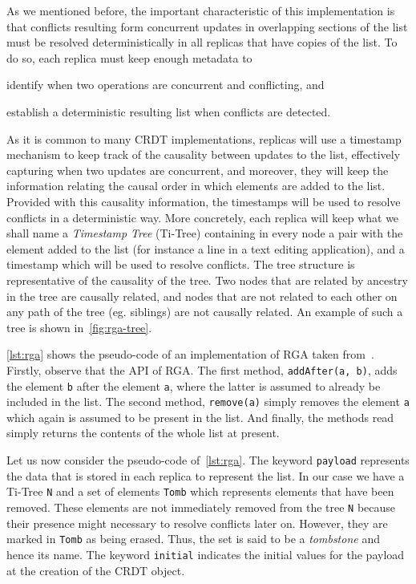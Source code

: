 As we mentioned before, the important characteristic of this
implementation is that conflicts resulting form concurrent updates in
overlapping sections of the list must be resolved deterministically in
all replicas that have copies of the list.
%
To do so, each replica must keep enough metadata to
\begin{inparaenum}
\item identify when two operations are concurrent and conflicting, and
\item establish a deterministic resulting list when conflicts are detected.
\end{inparaenum}
%
As it is common to many CRDT implementations, replicas will use a
timestamp mechanism to keep track of the causality between updates to
the list, effectively capturing when two updates are concurrent, and
moreover, they will keep the information relating the causal order in
which elements are added to the list.
%
Provided with this causality information, the timestamps will be used
to resolve conflicts in a deterministic way.
%
More concretely, each replica will keep what we shall name a
\emph{Timestamp Tree} (Ti-Tree) containing in every node a pair with the
element added to the list (for instance a line in a text editing
application), and a timestamp which will be used to resolve conflicts.
The tree structure is representative of the causality of the tree.
Two nodes that are related by ancestry in the tree are causally
related, and nodes that are not related to each other on any path of
the tree (eg. siblings) are not causally related.
%
An example of such a tree is shown in~\ref{fig:rga-tree}.
%

\autoref{lst:rga} shows the pseudo-code of an implementation of RGA
taken from~\cite{}.
%
Firstly, observe that the API of RGA.
%
The first method, \lstinline|addAfter(a, b)|, adds the element
\lstinline|b| after the element \lstinline|a|, where the latter is
assumed to already be included in the list.
%
The second method, \lstinline|remove(a)| simply removes the element
\lstinline|a| which again is assumed to be present in the list.
%
And finally, the methods read simply returns the contents of the whole
list at present.

Let us now consider the pseudo-code of~\autoref{lst:rga}. 
%
The keyword \lstinline|payload| represents the data that is stored in
each replica to represent the list.
%
In our case we have a Ti-Tree \lstinline|N| and a set of elements
\lstinline|Tomb| which represents elements that have been removed.
%
These elements are not immediately removed from the tree \lstinline|N|
because their presence might necessary to resolve conflicts later on.
%
However, they are marked in \lstinline|Tomb| as being erased.
%
Thus, the set is said to be a \emph{tombstone} and hence its name.
%
The keyword \lstinline|initial| indicates the initial values for the
payload at the creation of the CRDT object.

